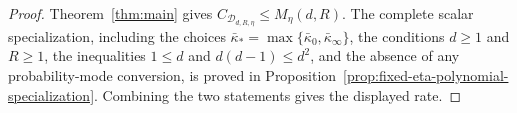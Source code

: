\begin{proof}
Theorem~\ref{thm:main} gives
$C_{\mathcal D_{d,R,\eta}}\leq M_\eta(d,R)$.  The complete scalar
specialization, including the choices
$\bar\kappa_*=\max\{\bar\kappa_0,\bar\kappa_\infty\}$, the conditions
$d\geq1$ and $R\geq1$, the inequalities $1\leq d$ and
$d(d-1)\leq d^2$, and the absence of any probability-mode conversion, is
proved in Proposition~\ref{prop:fixed-eta-polynomial-specialization}.
Combining the two statements gives the displayed rate.
\end{proof}

